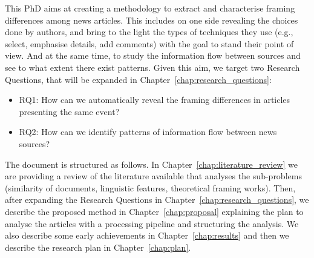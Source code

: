 
This PhD aims at creating a methodology to extract and characterise framing differences among news articles.
This includes on one side revealing the choices done by authors, and bring to the light the types of techniques they use (e.g., select, emphasise details, add comments)  with the goal to stand their point of view.
And at the same time, to study the information flow between sources and see to what extent there exist patterns.
Given this aim, we target two Research Questions, that will be expanded in Chapter~\ref{chap:research_questions}:

\begin{itemize}
    \item RQ1: How can we automatically reveal the framing differences in articles presenting the same event?
    \item RQ2: How can we identify patterns of information flow between news sources?
\end{itemize}









The document is structured as follows.
In Chapter~\ref{chap:literature_review} we are providing a review of the literature available that analyses the sub-problems (similarity of documents, linguistic features, theoretical framing works).
Then, after expanding the Research Questions in Chapter~\ref{chap:research_questions}, we describe the proposed method in Chapter~\ref{chap:proposal} explaining the plan to analyse the articles with a processing pipeline and structuring the analysis.
We also describe some early achievements in Chapter~\ref{chap:results} and then we describe the research plan in Chapter~\ref{chap:plan}.


